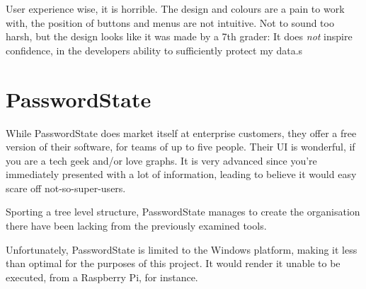 \documentclass[a4paper,10pt]{article}
\begin{document}
	User experience wise, it is horrible. The design and colours are a pain to work with, the position of buttons and menus are not intuitive. Not to sound too harsh, but the design looks like it was made by a 7th grader: It does \emph{not} inspire confidence, in the developers ability to sufficiently protect my data.s

\section{PasswordState}
	While PasswordState does market itself at enterprise customers, they offer a free version of their software, for teams of up to five people. Their UI is wonderful, if you are a tech geek and/or love graphs. It is very advanced since you're immediately presented with a lot of information, leading to believe it would easy scare off not-so-super-users.

	Sporting a tree level structure, PasswordState manages to create the organisation there have been lacking from the previously examined tools.

	Unfortunately, PasswordState is limited to the Windows platform, making it less than optimal for the purposes of this project. It would render it unable to be executed, from a Raspberry Pi, for instance.
\end{document}
